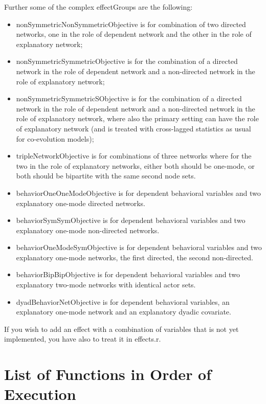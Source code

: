 \documentclass[a4paper,fleqn,11pt]{article}
\newcommand{\+}{\, + \,}
\newcommand{\sfn}[1]{\textsf{#1}}
\begin{document}
Further some of the complex effectGroups are the following:
\begin{itemize}
\item \sfn{nonSymmetricNonSymmetricObjective} is for combination of two
    directed networks, one in the role of dependent network and the other
    in the role of explanatory network;
\item \sfn{nonSymmetricSymmetricObjective} is for the combination of a
    directed network in the role of dependent network and a non-directed network
    in the role of explanatory network;
\item \sfn{nonSymmetricSymmetricSObjective} is for the combination of a
    directed network in the role of dependent network and a non-directed network
    in the role of explanatory network, where also the primary setting
    can have the role of explanatory network (and is treated with cross-lagged
    statistics as usual for co-evolution models);
\item \sfn{tripleNetworkObjective} is for combinations
    of three networks where for the two in the role of explanatory networks,
    either both should be one-mode, or both should be bipartite with the same second node sets.
\item \sfn{behaviorOneOneModeObjective} is for dependent behavioral variables and
    two explanatory one-mode directed networks.
\item \sfn{behaviorSymSymObjective} is for dependent behavioral variables and
    two explanatory one-mode non-directed networks.
\item \sfn{behaviorOneModeSymObjective} is for dependent behavioral variables and
    two explanatory one-mode networks, the first directed, the second non-directed.
\item \sfn{behaviorBipBipObjective} is for dependent behavioral variables and
    two explanatory two-mode networks with identical actor sets.
\item \sfn{dyadBehaviorNetObjective} is for dependent behavioral variables,
   an explanatory one-mode network and an explanatory dyadic covariate.
\end{itemize}

If you wish to add an effect with a combination of variables that is not yet implemented,
you have also to treat it in \sfn{effects.r}.


\appendix
\newpage
\section{List of Functions in Order of Execution}
\end{document}

